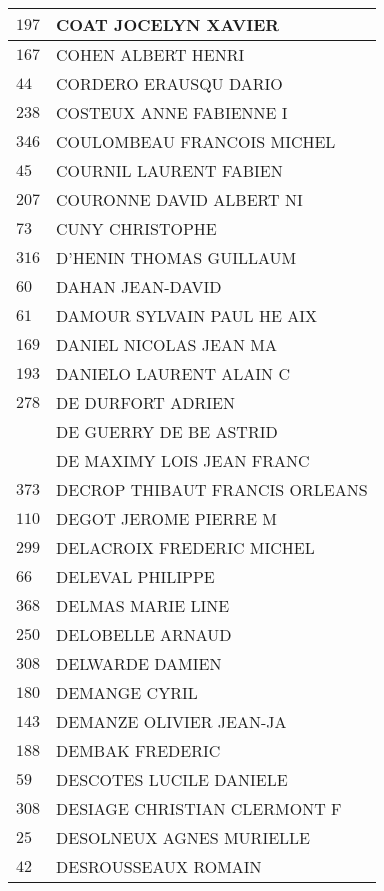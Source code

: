 \begin{xltabular}{\linewidth}{|l|X|}
    \hline
    $197$ & COAT JOCELYN XAVIER \\
    \hline
    $167$ & COHEN ALBERT HENRI \\
    \hline
    $44$ & CORDERO ERAUSQU DARIO \\
    \hline
    $238$ & COSTEUX ANNE FABIENNE I \\
    \hline
    $346$ & COULOMBEAU FRANCOIS MICHEL \\
    \hline
    $45$ & COURNIL LAURENT FABIEN \\
    \hline
    $207$ & COURONNE DAVID ALBERT NI \\
    \hline
    $73$ & CUNY CHRISTOPHE \\
    \hline
    $316$ & D'HENIN THOMAS GUILLAUM \\
    \hline
    $60$ & DAHAN JEAN-DAVID \\
    \hline
    $61$ & DAMOUR SYLVAIN PAUL HE AIX \\
    \hline
    $169$ & DANIEL NICOLAS JEAN MA \\
    \hline
    $193$ & DANIELO LAURENT ALAIN C \\
    \hline
    $278$ & DE DURFORT ADRIEN \\
    \hline
    & DE GUERRY DE BE ASTRID \\
    \hline
    & DE MAXIMY LOIS JEAN FRANC \\
    \hline
    $373$ & DECROP THIBAUT FRANCIS ORLEANS \\
    \hline
    $110$ & DEGOT JEROME PIERRE M \\
    \hline
    $299$ & DELACROIX FREDERIC MICHEL \\
    \hline
    $66$ & DELEVAL PHILIPPE \\
    \hline
    $368$ & DELMAS MARIE LINE \\
    \hline
    $250$ & DELOBELLE ARNAUD \\
    \hline
    $308$ & DELWARDE DAMIEN \\
    \hline
    $180$ & DEMANGE CYRIL \\
    \hline
    $143$ & DEMANZE OLIVIER JEAN-JA \\
    \hline
    $188$ & DEMBAK FREDERIC \\
    \hline
    $59$ & DESCOTES LUCILE DANIELE \\
    \hline
    $308$ & DESIAGE CHRISTIAN CLERMONT F \\
    \hline
    $25$ & DESOLNEUX AGNES MURIELLE \\
    \hline
    $42$ & DESROUSSEAUX ROMAIN \\

\end{xltabular}
